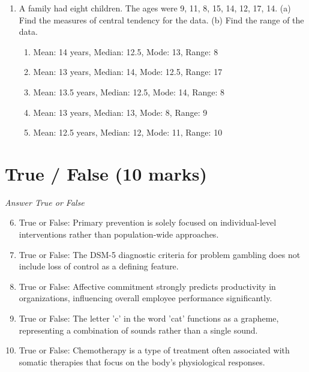 \documentclass[12pt]{article}
\begin{document}
\begin{enumerate}[label=\arabic*.]
\begin{enumerate}[label=(\alph*)]
    \item Homeostatic regulation
    \item Hierarchy of needs
    \item Self-determination theory
    \item Intrinsic motivation
    \item Maslow's pyramid of desire
\end{enumerate}
\item A family had eight children. The ages were 9, 11, 8, 15, 14, 12, 17, 14. (a) Find the measures of central tendency for the data. (b) Find the range of the data.
\begin{enumerate}[label=(\alph*)]
    \item Mean: 14 years, Median: 12.5, Mode: 13, Range: 8
    \item Mean: 13 years, Median: 14, Mode: 12.5, Range: 17
    \item Mean: 13.5 years, Median: 12.5, Mode: 14, Range: 8
    \item Mean: 13 years, Median: 13, Mode: 8, Range: 9
    \item Mean: 12.5 years, Median: 12, Mode: 11, Range: 10
\end{enumerate}
\end{enumerate}

\section*{True / False (10 marks)}
\textit{Answer True or False}
\begin{enumerate}[label=\arabic*.]
\setcounter{enumi}{5}
\item True or False: Primary prevention is solely focused on individual-level interventions rather than population-wide approaches.
\item True or False: The DSM-5 diagnostic criteria for problem gambling does not include loss of control as a defining feature.
\item True or False: Affective commitment strongly predicts productivity in organizations, influencing overall employee performance significantly.
\item True or False: The letter 'c' in the word 'cat' functions as a grapheme, representing a combination of sounds rather than a single sound.
\item True or False: Chemotherapy is a type of treatment often associated with somatic therapies that focus on the body's physiological responses.
\end{enumerate}
\end{document}
